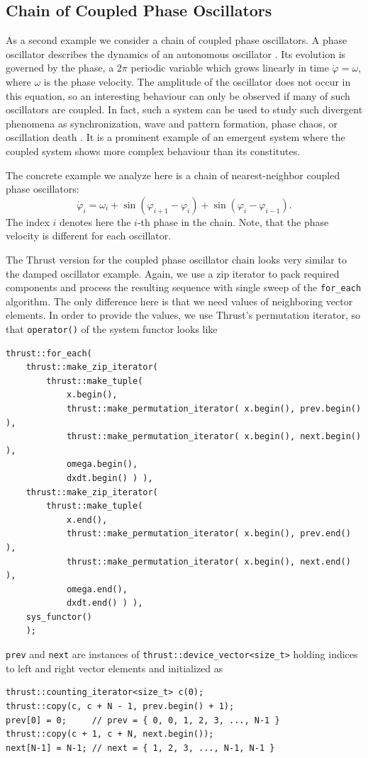\documentclass[final]{siamltex}
\newcommand{\code}[1]{\lstinline|#1|}
\begin{document}
%
%
\subsection{Chain of Coupled Phase Oscillators}

As a second example we consider a chain of coupled phase
oscillators. A phase oscillator describes the dynamics of an
autonomous oscillator \cite{PhaseOscillator}. Its evolution is
governed by the phase, a $2\pi$ periodic variable which grows linearly
in time $\dot{\varphi} = \omega$, where $\omega$ is the phase
velocity. The amplitude of the oscillator does not occur in this
equation, so an interesting behaviour can only be observed if many
of such oscillators are coupled. In fact, such a system can be used to
study such divergent phenomena as synchronization, wave and pattern
formation, phase chaos, or oscillation death
\cite{Synchronization-Pikovsky,Kuramoto-84}. It is a prominent example
of an emergent system where the coupled system shows more complex
behaviour than its constitutes.


The concrete example we analyze here is a chain of nearest-neighbor
coupled phase oscillators:
\begin{equation} \label{eq:phasesystem}
    \dot{\varphi}_i = \omega_i + \sin( \varphi_{i+1} - \varphi_i) + \sin( \varphi_i
    - \varphi_{i-1}).
\end{equation}
The index $i$ denotes here the $i$-th phase in the chain. Note, that
the phase velocity is different for each oscillator.

The Thrust version for the coupled phase oscillator chain looks very similar to
the damped oscillator example. Again, we use a zip iterator to pack required
components and process the resulting sequence with single sweep of the
\code{for_each} algorithm. The only difference here is that we need values of
neighboring vector elements. In order to provide the values, we use Thrust's
permutation iterator, so that \code{operator()} of the system functor looks
like
\begin{lstlisting}
thrust::for_each(
    thrust::make_zip_iterator(
        thrust::make_tuple(
            x.begin(),
            thrust::make_permutation_iterator( x.begin(), prev.begin() ),
            thrust::make_permutation_iterator( x.begin(), next.begin() ),
            omega.begin(),
            dxdt.begin() ) ),
    thrust::make_zip_iterator(
        thrust::make_tuple(
            x.end(),
            thrust::make_permutation_iterator( x.begin(), prev.end() ),
            thrust::make_permutation_iterator( x.begin(), next.end() ),
            omega.end(),
            dxdt.end() ) ),
    sys_functor()
    );
\end{lstlisting}
\code{prev} and \code{next} are instances of
\code{thrust::device_vector<size_t>} holding indices to left and right vector
elements and initialized as
\begin{lstlisting}
thrust::counting_iterator<size_t> c(0);
thrust::copy(c, c + N - 1, prev.begin() + 1);
prev[0] = 0;     // prev = { 0, 0, 1, 2, 3, ..., N-1 }
thrust::copy(c + 1, c + N, next.begin());
next[N-1] = N-1; // next = { 1, 2, 3, ..., N-1, N-1 }
\end{lstlisting}
\end{document}
